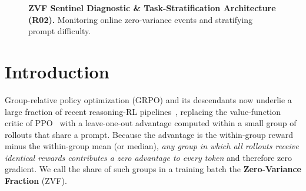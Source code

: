 \documentclass{article}
\begin{document}
\begin{figure}[htbp]
\centering
{}
\caption{\textbf{ZVF Sentinel Diagnostic \& Task-Stratification Architecture (R02).} Monitoring online zero-variance events and stratifying prompt difficulty.}
\label{fig:zvf_sentinel_architecture}
\end{figure}

\section{Introduction}
\label{sec:intro}

Group-relative policy optimization (GRPO) and its descendants now underlie a
large fraction of recent reasoning-RL pipelines~\citep{shao2024deepseekmath,guo2025deepseekr1nature}, replacing the value-function critic of
PPO~\citep{schulman2017proximal} with a leave-one-out advantage computed
within a small group of rollouts that share a prompt. Because the advantage
is the within-group reward minus the within-group mean (or median),
\emph{any group in which all rollouts receive identical rewards contributes a
zero advantage to every token} and therefore zero gradient. We call the
share of such groups in a training batch the \textbf{Zero-Variance Fraction}
(ZVF).
\end{document}
